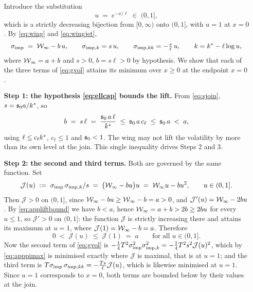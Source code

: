 Introduce the substitution
\[
  u \;=\; e^{-x/\ell}\;\in\;(0,1],
\]
which is a strictly decreasing bijection from $[0,\infty)$ onto $(0,1]$, with $u=1$ at $x=0$. By
\eqref{eq:wing} and \eqref{eq:wingjet},
\begin{equation}\label{eq:appmasterjet}
  \sigma_{\mathrm{imp}} \;=\; \mathcal{W}_{\infty}-b\,u,\qquad \sigma_{\mathrm{imp},k}=s\,u,\qquad \sigma_{\mathrm{imp},kk}=-\tfrac{s}{\ell}\,u,
  \qquad k=k^{*}-\ell\log u,
\end{equation}
where $\mathcal{W}_{\infty}=a+b$ and $s>0$, $b=s\ell>0$ by hypothesis. We show that each of the three terms of
\eqref{eq:gvol} attains its minimum over $x\ge0$ at the endpoint $x=0$.

\medskip
\noindent\textbf{Step 1: the hypothesis \eqref{eq:ellcap} bounds the lift.} From \eqref{eq:sjoin},
$s=\mathfrak{s}_{0}a/k^{*}$, so
\begin{equation}\label{eq:appliftbound}
  b \;=\; s\,\ell \;=\; \frac{\mathfrak{s}_{0}\,a\,\ell}{k^{*}} \;\le\; \mathfrak{s}_{0}\,a\,c_{\ell}\;\le\;\mathfrak{s}_{0}\,a \;<\; a,
\end{equation}
using $\ell\le c_{\ell}k^{*}$, $c_{\ell}\le1$ and $\mathfrak{s}_{0}<1$. The wing may not lift the
volatility by more than its own level at the join. This single inequality drives Steps 2 and 3.

\medskip
\noindent\textbf{Step 2: the second and third terms.} Both are governed by the same function. Set
\[
  \mathcal{J}(u)\;:=\;\sigma_{\mathrm{imp}}\,\sigma_{\mathrm{imp},k}/s\;=\;\bigl(\mathcal{W}_{\infty}-bu\bigr)u\;=\;\mathcal{W}_{\infty} u-b u^{2},
  \qquad u\in(0,1].
\]
Then $\mathcal{J}>0$ on $(0,1]$, since $\mathcal{W}_{\infty}-bu\ge\mathcal{W}_{\infty}-b=a>0$, and $\mathcal{J}'(u)=\mathcal{W}_{\infty}-2bu$. By
\eqref{eq:appliftbound} we have $b<a$, hence $\mathcal{W}_{\infty}=a+b>2b\ge2bu$ for every $u\le1$, so $\mathcal{J}'>0$ on
$(0,1]$: the function $\mathcal{J}$ is strictly increasing there and attains its maximum at $u=1$, where
$\mathcal{J}(1)=\mathcal{W}_{\infty}-b=a$. Therefore
\begin{equation}\label{eq:apppimax}
  0\;<\;\mathcal{J}(u)\;\le\;\mathcal{J}(1)\;=\;a \qquad\text{for all } u\in(0,1].
\end{equation}
Now the second term of \eqref{eq:gvol} is
$-\tfrac14T^{2}\sigma_{\mathrm{imp}}^{2}\sigma_{\mathrm{imp},k}^{2}=-\tfrac14T^{2}s^{2}\mathcal{J}(u)^{2}$, which by \eqref{eq:apppimax} is
minimised exactly where $\mathcal{J}$ is maximal, that is at $u=1$; and the third term is
$T\sigma_{\mathrm{imp}}\,\sigma_{\mathrm{imp},kk}=-\tfrac{Ts}{\ell}\mathcal{J}(u)$, which is likewise minimised at $u=1$. Since $u=1$
corresponds to $x=0$, both terms are bounded below by their values at the join.

